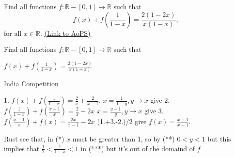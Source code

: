 \begin{problem}
	Find all functions $ f:\mathbb{R}-[0,1]\to\mathbb{R}$ such that 
\[f(x)+f\left(\frac{1}{1-x}\right) = \frac{2(1-2x)}{x(1-x)},\]
for all $x \in \mathbb R$.
	\flushright \href{https://artofproblemsolving.com/community/c6h162892}{(Link to AoPS)}
\end{problem}



\begin{mysolution}
	\begin{tcolorbox}Find all functions $ f:\mathbb{R}-[0,1]\to\mathbb{R}$ such that 

$ f(x)+f\left(\frac{1}{1-x}\right) =\frac{2(1-2x)}{x(1-x)}$

India Competition\end{tcolorbox}
1. $ f(x)+f(\frac{1}{1-x}) =\frac{2}{x}+\frac{2}{x-1}$.
$ x =\frac{1}{1-y}, y\to x$ give
2. $ f(\frac{1}{1-x})+f(\frac{x-1}{x}) =\frac{2}{x}-2x$
$ x =\frac{y-1}{y}, y\to x$ give
3. $ f(\frac{x-1}{x})+f(x) =\frac{2x}{x-1}-2x$
(1.+3.-2.)/2 give
$ f(x) =\frac{x+1}{x-1}$.
\end{mysolution}



\begin{mysolution}

Rust see that, in (*) $ x$ must be greater than 1, so by (**) $ 0<y<1$ but this implies that $ \frac{1}{2}<\frac{1}{1-x}<1$ in (***) but it's out of the domaind of $ f$
\end{mysolution}



